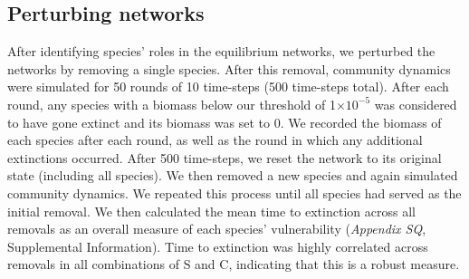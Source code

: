 \documentclass[12pt]{article}
\begin{document}


  \subsection*{Perturbing networks}

    After identifying species' roles in the equilibrium networks, we perturbed the networks by removing a single species. After this removal, community dynamics were simulated for 50 rounds of 10 time-steps (500 time-steps total). After each round, any species with a biomass below our threshold of 1$\times10^{-5}$ was considered to have gone extinct and its biomass was set to 0. We recorded the biomass of each species after each round, as well as the round in which any additional extinctions occurred. After 500 time-steps, we reset the network to its original state (including all species). We then removed a new species and again simulated community dynamics. We repeated this process until all species had served as the initial removal.
    We then calculated the mean time to extinction across all removals as an overall measure of each species' vulnerability (\emph{Appendix SQ}, Supplemental Information). 
    Time to extinction was highly correlated across removals in all combinations of S and C, indicating that this is a robust measure.
\end{document}
